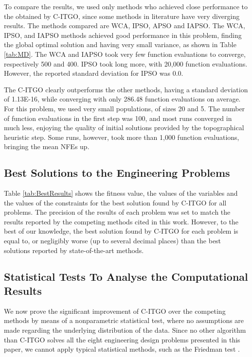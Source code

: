 To compare the results, we used only methods who achieved close performance to the obtained by C-ITGO, since some methods in literature have very diverging results. The methods compared are WCA, IPSO, APSO and IAPSO. The WCA, IPSO, and IAPSO methods achieved good performance in this problem, finding the global optimal solution and having very small variance, as shown in Table \ref{tab:MD}. The WCA and IAPSO took very few function evaluations to converge, respectively 500 and 400. IPSO took long more, with 20,000 function evaluations. However, the reported standard deviation for IPSO was 0.0.



The C-ITGO clearly outperforms the other methods, having a standard deviation of 1.13E-16, while converging with only 286.48 function evaluations on average. For this problem, we used very small populations, of sizes 20 and 5. The number of function evaluations in the first step was 100, and most runs converged in much less, enjoying the quality of initial solutions provided by the topographical heuristic step. Some runs, however, took more than 1,000 function evaluations, bringing the mean NFEs up.



\subsection{Best Solutions to the Engineering Problems}

Table \ref{tab:BestResults} shows the fitness value, the values of the variables and the values of the constraints for the best solution found by C-ITGO for all problems. The precision of the results of each problem was set to match the results reported by the competing methods cited in this work. However, to the best of our knowledge, the best solution found by C-ITGO for each problem is equal to, or negligibly worse (up to several decimal places) than the best solutions reported by state-of-the-art methods.




\subsection{Statistical Tests To Analyse the Computational Results}

We now prove the significant improvement of C-ITGO over the competing methods by means of a nonparametric statistical test, where no assumptions are made regarding the underlying distribution of the data. Since no other algorithm than C-ITGO solves all the eight engineering design problems presented in this paper, we cannot apply typical statistical methods, such as the Friedman test \citep{Friedman}.

